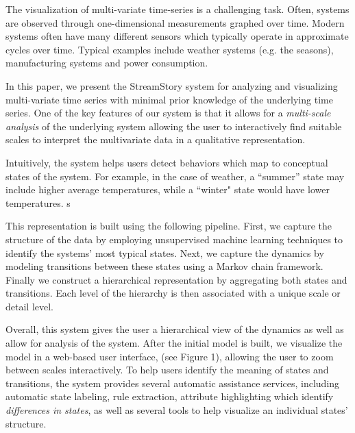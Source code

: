 The visualization of multi-variate time-series is a challenging task. Often, systems are observed through one-dimensional measurements graphed over time. Modern systems often have many different sensors which 
typically operate in approximate cycles over time. Typical examples include weather systems (e.g. the seasons), manufacturing systems and power consumption. 

In this paper, we  present the StreamStory system for analyzing and visualizing multi-variate time series with minimal prior knowledge of the underlying time series. One of the key features of our system is that it allows for a \emph{multi-scale analysis} of the underlying system allowing the user to interactively find suitable scales to interpret the multivariate data in a qualitative representation.  

Intuitively, the system helps users detect behaviors which map to conceptual states of the system. For example, in the case of weather, a ``summer'' state may include higher average temperatures, while a ``winter" state would have lower temperatures. s

This representation is built using the following pipeline. First, we capture the structure of the data by employing unsupervised machine learning
techniques to identify the systems' most typical states. Next, we capture the
dynamics by modeling transitions between these states using a Markov chain framework.
Finally we construct a hierarchical representation by aggregating both
states and transitions. Each level of the hierarchy is then associated with a unique
scale or detail level.

Overall, this system gives the user a hierarchical view of the dynamics as well as 
allow for analysis of the system. After the initial model is built, we visualize the model
in a web-based user interface, (see Figure 1), allowing the 
user to zoom between scales interactively. To help users identify the
meaning of states and transitions, the system provides several automatic assistance services,
including automatic state labeling, rule extraction, attribute highlighting which
identify \emph{differences in states}, as well as several tools to help visualize an individual states'
structure. 


